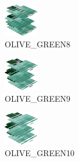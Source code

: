 \hspace{0.1cm}
\begin{minipage}[b]{0.15\linewidth}
\begin{figure}[H]                                                          
  \centering                                                             
  \begin{adjustbox}{width=1.5cm,center}                                   
  \includegraphics[width=1.5cm]{src/colorspace_colourflow/flows/colourflow_184-45.png}%
  \end{adjustbox}                                                        
\caption*{OLIVE\_GREEN8}                                           
\end{figure}                                                               
\end{minipage}
\hspace{0.1cm}
\begin{minipage}[b]{0.15\linewidth}
\begin{figure}[H]                                                          
  \centering                                                             
  \begin{adjustbox}{width=1.5cm,center}                                   
  \includegraphics[width=1.5cm]{src/colorspace_colourflow/flows/colourflow_185-45.png}%
  \end{adjustbox}                                                        
\caption*{OLIVE\_GREEN9}                                           
\end{figure}                                                               
\end{minipage}
\hspace{0.1cm}
\begin{minipage}[b]{0.15\linewidth}
\begin{figure}[H]                                                          
  \centering                                                             
  \begin{adjustbox}{width=1.5cm,center}                                   
  \includegraphics[width=1.5cm]{src/colorspace_colourflow/flows/colourflow_186-45.png}%
  \end{adjustbox}                                                        
\caption*{OLIVE\_GREEN10}                                           
\end{figure}                                                               
\end{minipage}
